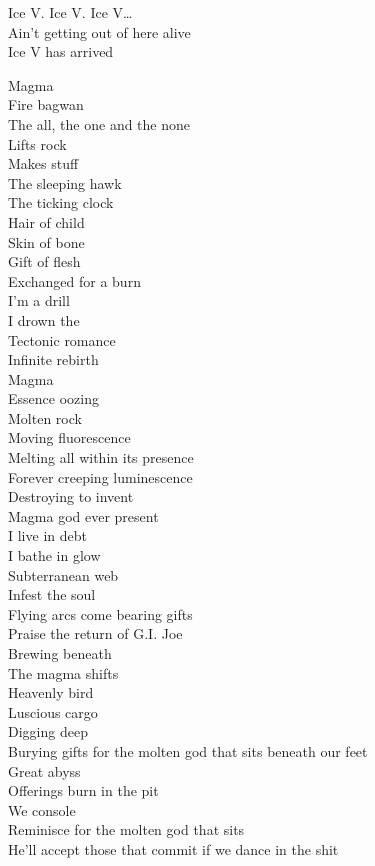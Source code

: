 Ice V. Ice V. Ice V… \\

Ain't getting out of here alive \\
Ice V has arrived \\




Magma \\
Fire bagwan \\
The all, the one and the none \\
Lifts rock \\
Makes stuff \\
The sleeping hawk \\
The ticking clock \\
Hair of child \\
Skin of bone \\
Gift of flesh \\
Exchanged for a burn \\
I'm a drill \\
I drown the  \\
Tectonic romance \\
Infinite rebirth \\
Magma \\
Essence oozing \\
Molten rock \\
Moving fluorescence \\
Melting all within its presence \\
Forever creeping luminescence \\
Destroying to invent \\
Magma god ever present \\
I live in debt \\
I bathe in glow \\
Subterranean web \\
Infest the soul \\
Flying arcs come bearing gifts \\
Praise the return of G.I. Joe \\
Brewing beneath \\
The magma shifts \\
Heavenly bird \\
Luscious cargo \\
Digging deep \\
Burying gifts for the molten god that sits beneath our feet \\
Great abyss \\
Offerings burn in the pit \\
We console \\
Reminisce for the molten god that sits \\
He'll accept those that commit if we dance in the shit \\

